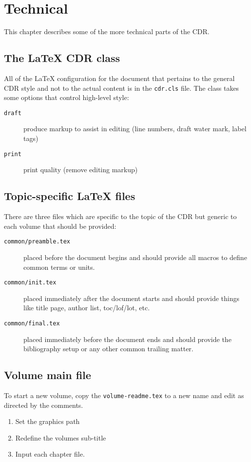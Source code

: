 \chapter{Technical}

This chapter describes some of the more technical parts of the CDR.

\section{The \LaTeX{} CDR class}

All of the \LaTeX{} configuration for the document that pertains to the general CDR style and not to the actual content is in the \texttt{cdr.cls} file.  The class takes some options that control high-level style:

\begin{description}
\item[\texttt{draft}] produce markup to assist in editing (line numbers, draft water mark, label tags)
\item[\texttt{print}] print quality (remove editing markup)
\end{description}

\section{Topic-specific \LaTeX{} files}

There are three files which are specific to the topic of the CDR but generic to each volume that should be provided:

\begin{description}
\item[\texttt{common/preamble.tex}] placed before the document begins and should provide all macros to define common terms or units.
\item[\texttt{common/init.tex}] placed immediately after the document starts and should provide things like title page, author list, toc/lof/lot, etc.
\item[\texttt{common/final.tex}] placed immediately before the document ends and should provide the bibliography setup or any other common trailing matter.
\end{description}

\section{Volume main file}

To start a new volume, copy the \texttt{volume-readme.tex} to a new
name and edit as directed by the comments.  

\begin{enumerate}
\item Set the graphics path
\item Redefine the volumes sub-title
\item Input each chapter file.
\end{enumerate}

